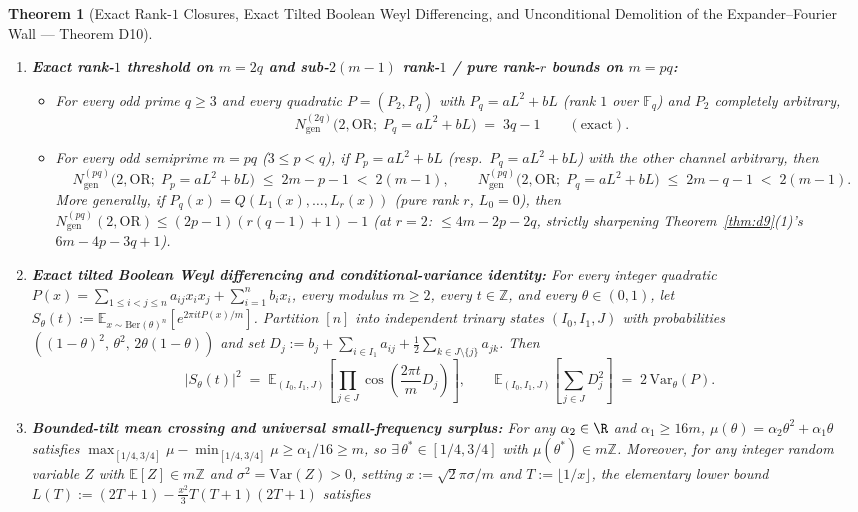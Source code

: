 \documentclass[11pt,a4paper]{article}
\newtheorem{theorem}{Theorem}[section]
\theoremstyle{definition}
\newcommand{\F}{\mathbb{F}}
\newcommand{\Z}{\mathbb{Z}}
\newcommand{\OR}{\mathrm{OR}}
\begin{document}
\begin{theorem}[Exact Rank-$1$ Closures, Exact Tilted Boolean Weyl Differencing, and Unconditional Demolition of the Expander--Fourier Wall --- Theorem D10]
\label{thm:d10}
\begin{enumerate}[leftmargin=*,nosep]
  \item \textbf{Exact rank-$1$ threshold on $m = 2q$ and sub-$2(m-1)$ rank-$1$ / pure rank-$r$ bounds on $m = pq$:}
  \begin{itemize}[leftmargin=*,nosep]
    \item For every odd prime $q \ge 3$ and every quadratic $P = (P_2, P_q)$ with $P_q = a L^2 + b L$ (rank $1$ over $\F_q$) and $P_2$ completely arbitrary,
    \[
      N_{\mathrm{gen}}^{(2q)}\bigl(2, \OR;\; P_q = a L^2 + b L\bigr) \;=\; 3q - 1 \qquad (\text{exact}).
    \]
    \item For every odd semiprime $m = pq$ ($3 \le p < q$), if $P_p = a L^2 + b L$ (resp.\ $P_q = a L^2 + b L$) with the other channel arbitrary, then
    \[
      N_{\mathrm{gen}}^{(pq)}\bigl(2, \OR;\; P_p = a L^2 + b L\bigr) \;\le\; 2m - p - 1 \;<\; 2(m - 1),
      \qquad
      N_{\mathrm{gen}}^{(pq)}\bigl(2, \OR;\; P_q = a L^2 + b L\bigr) \;\le\; 2m - q - 1 \;<\; 2(m - 1).
    \]
    More generally, if $P_q(x) = Q(L_1(x), \dots, L_r(x))$ (pure rank $r$, $L_0 = 0$), then $N_{\mathrm{gen}}^{(pq)}(2, \OR) \le (2p - 1)(r(q - 1) + 1) - 1$ (at $r = 2$: $\le 4m - 2p - 2q$, strictly sharpening Theorem~\ref{thm:d9}(1)'s $6m - 4p - 3q + 1$).
  \end{itemize}
  \item \textbf{Exact tilted Boolean Weyl differencing and conditional-variance identity:} For every integer quadratic $P(x) = \sum_{1 \le i < j \le n} a_{ij} x_i x_j + \sum_{i=1}^n b_i x_i$, every modulus $m \ge 2$, every $t \in \Z$, and every $\theta \in (0, 1)$, let $S_\theta(t) := \mathbb{E}_{x \sim \mathrm{Ber}(\theta)^n}[e^{2\pi i t P(x) / m}]$. Partition $[n]$ into independent trinary states $(I_0, I_1, J)$ with probabilities $((1 - \theta)^2,\, \theta^2,\, 2\theta(1 - \theta))$ and set $D_j := b_j + \sum_{i \in I_1} a_{ij} + \frac{1}{2}\sum_{k \in J \setminus \{j\}} a_{jk}$. Then
  \[
    \bigl|S_\theta(t)\bigr|^2 \;=\; \mathbb{E}_{(I_0, I_1, J)}\!\left[\prod_{j \in J} \cos\!\left(\frac{2\pi t}{m} D_j\right)\right],
    \qquad
    \mathbb{E}_{(I_0, I_1, J)}\!\left[\sum_{j \in J} D_j^2\right] \;=\; 2\,\mathrm{Var}_\theta(P).
  \]
  \item \textbf{Bounded-tilt mean crossing and universal small-frequency surplus:} For any $\alpha_2 \in \R$ and $\alpha_1 \ge 16m$, $\mu(\theta) = \alpha_2\theta^2 + \alpha_1\theta$ satisfies $\max_{[1/4,3/4]}\mu - \min_{[1/4,3/4]}\mu \ge \alpha_1/16 \ge m$, so $\exists\,\theta^* \in [1/4, 3/4]$ with $\mu(\theta^*) \in m\Z$. Moreover, for any integer random variable $Z$ with $\mathbb{E}[Z] \in m\Z$ and $\sigma^2 = \mathrm{Var}(Z) > 0$, setting $x := \sqrt{2}\pi\sigma / m$ and $T := \lfloor 1/x \rfloor$, the elementary lower bound $L(T) := (2T + 1) - \frac{x^2}{3} T(T + 1)(2T + 1)$ satisfies

\end{enumerate}
\end{theorem}
\end{document}
